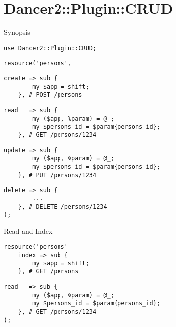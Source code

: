 
\section{Dancer2::Plugin::CRUD}


\begin{frame}[fragile]{Synopsis}
\pause
\begin{lstlisting}
use Dancer2::Plugin::CRUD;
\end{lstlisting}\pause\begin{lstlisting}[firstnumber=last]
resource('persons',
\end{lstlisting}\pause\begin{lstlisting}[firstnumber=last]
    create => sub {
        my $app = shift;
    }, # POST /persons
\end{lstlisting}\pause\begin{lstlisting}[firstnumber=last]
    read   => sub {
        my ($app, %param) = @_;
        my $persons_id = $param{persons_id};
    }, # GET /persons/1234
\end{lstlisting}\pause\begin{lstlisting}[firstnumber=last]
    update => sub {
        my ($app, %param) = @_;
        my $persons_id = $param{persons_id};
    }, # PUT /persons/1234
\end{lstlisting}\pause\begin{lstlisting}[firstnumber=last]
    delete => sub {
        ...
    }, # DELETE /persons/1234
);
\end{lstlisting}
\end{frame}


\begin{frame}[fragile]{Read and Index}
\pause
\begin{lstlisting}
resource('persons'
    index => sub {
        my $app = shift;
    }, # GET /persons
\end{lstlisting}\pause\begin{lstlisting}[firstnumber=last]
    read   => sub {
        my ($app, %param) = @_;
        my $persons_id = $param{persons_id};
    }, # GET /persons/1234
);
\end{lstlisting}
\end{frame}

